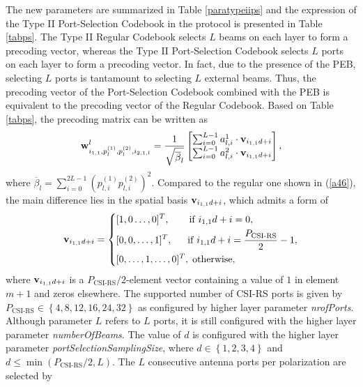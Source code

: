 \documentclass[lettersize,journal]{IEEEtran}
\begin{document}
\begin{appendices}
The new parameters are summarized in Table \ref{paratypeiips} and the expression of the Type II Port-Selection Codebook in the protocol is presented in Table \ref{tabps}. The Type II Regular Codebook selects $L$ beams on each layer to form a precoding vector, whereas the Type II Port-Selection Codebook selects $L$ ports on each layer to form a precoding vector. In fact, due to the presence of the PEB, selecting $L$ ports is tantamount to selecting $L$ external beams. Thus, the precoding vector of the Port-Selection Codebook combined with the PEB is equivalent to the precoding vector of the Regular Codebook. Based on Table \ref{tabps}, the precoding matrix can be written as
\begin{equation}
{\bf{w}}^l_{i_{1,1},p^{(1)}_l,p^{(2)}_l,i_{2,1,l}}
=\frac{1}{\sqrt{{\overline \beta  _l}}}
\begin{bmatrix}\sum^{L-1}_{i=0}a_{l,i}^1 \cdot {\bf{v}}_{i_{1,1}d+i}\\
\sum^{L-1}_{i=0}a_{l,i}^2 \cdot{\bf{v}}_{i_{1,1}d+i}
\end{bmatrix}, 
\end{equation}
where ${\overline \beta  _l} = \sum^{2L-1}_{i=0}(p_{l,i}^{(1)}p_{l,i}^{(2)})^2$. Compared to the regular one shown in (\ref{a46}), the main difference lies in the spatial basis ${\bf{v}}_{i_{1,1}d+i}$, which admits a form of
\begin{equation}\label{vd}
{\bf{v}}_{i_{1,1}d+i} = \left\{ {\begin{aligned}
&{[1,0\ldots,0]^T,\qquad {\rm{if}}\;{i_{1,1}d+i} = 0},\\
&{[0,0,\ldots,1]^T,\;\; \quad  {\rm{if}}\;{i_{1,1}d+i} = \frac{{P_{{\text{CSI-RS}}}} }{2}- 1,
}\\
&{[0,\ldots,1,\ldots,0]^T,\; {\rm{otherwise,}}}
\end{aligned}} \right.
\end{equation}
where ${\bf{v}}_{i_{1,1}d+i}$ is a ${P_{{\text{CSI-RS}}}}/2$-element vector containing a value of $1$ in element $m+1$ and zeros elsewhere.
The supported number of CSI-RS ports is given by ${P_{{\text{CSI-RS}}}} \in \left\{ {4,8,12,16,24,32} \right\}$ as configured by higher layer parameter \emph{nrofPorts}. Although parameter $L$ refers to $L$ ports, it is still configured with the higher layer parameter \emph{numberOfBeams}. The value of $d$  is configured with the higher layer parameter \emph{portSelectionSamplingSize}, where $d \in \left\{ {1,2,3,4} \right\}$ and 
$d \le \min \left( {{P_{{\text{CSI-RS}}}}/2,L} \right)$. The $L$ consecutive antenna ports per polarization are selected by 

\end{appendices}
\end{document}
